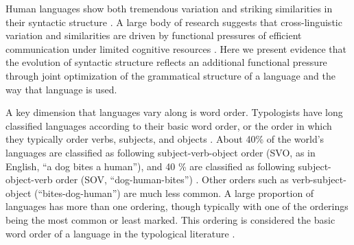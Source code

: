 \documentclass[11pt,a4paper]{article}
\newcommand\comment[1]{{\color{red}#1}}
\begin{document}







Human languages show both tremendous variation and striking similarities in their syntactic structure \citep{greenberg-universals-1963}. A large body of research suggests that cross-linguistic variation and similarities are driven by functional pressures of efficient communication under limited cognitive resources \citep{haspelmath2008parametric, kemp2018semantic, gibson2019how}. Here we present evidence that the evolution of syntactic structure reflects an additional functional pressure through joint optimization of the grammatical structure of a language and the way that language is used.



A key dimension that languages vary along is word order.
Typologists have long classified languages according to their basic word order, or the order in which they typically order verbs, subjects, and objects \citep{greenberg-universals-1963}.
About 40\% of the world's languages are classified as following subject-verb-object order ({SVO}, as in English, ``a dog bites a human''), and 40 \% are classified as following subject-object-verb order ({SOV}, ``dog-human-bites'') \citep{wals-81}.
Other orders such as verb-subject-object (``bites-dog-human'') are much less common.
A large proportion of languages has more than one ordering, though typically with one of the orderings being the most common or least marked.
This ordering is considered the  basic word order of a language in the typological literature \citep{greenberg-universals-1963, wals-s6}.
\end{document}
